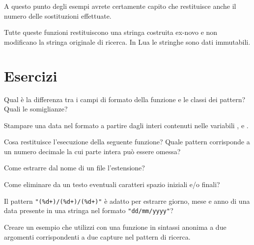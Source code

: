 A questo punto degli esempi avrete certamente capito che  restituisce
anche il numero delle sostituzioni effettuate.

Tutte queste funzioni restituiscono una stringa costruita ex-novo e non
modificano la stringa originale di ricerca. In Lua le stringhe sono dati
immutabili.



\section{Esercizi}

\begin{Exercise}[label=libstd-01]
Qual è la differenza tra i campi di formato della funzione  e
le classi dei pattern? Quali le somiglianze?
\end{Exercise}

\begin{Exercise}[label=libstd-02]
Stampare una data nel formato  a partire dagli interi contenuti
nelle variabili ,  e .
\end{Exercise}

\begin{Exercise}[label=libstd-03]
Cosa restituisce l'esecuzione della seguente funzione?
Quale pattern corrisponde a un numero decimale la cui parte intera può essere
omessa?
\end{Exercise}

\begin{Exercise}[label=libstd-04]
Come estrarre dal nome di un file l'estensione?
\end{Exercise}

\begin{Exercise}[label=libstd-05]
Come eliminare da un testo eventuali caratteri spazio iniziali e/o finali?
\end{Exercise}

\begin{Exercise}[label=libstd-06]
Il pattern \verb|"(%d+)/(%d+)/(%d+)"| è adatto per estrarre giorno, mese e
anno di una data presente in una stringa nel formato \verb|"dd/mm/yyyy"|?
\end{Exercise}

\begin{Exercise}[label=libstd-07]
Creare un esempio che utilizzi  con una funzione in sintassi
anonima a due argomenti corrispondenti a due capture nel pattern di ricerca.
\end{Exercise}


